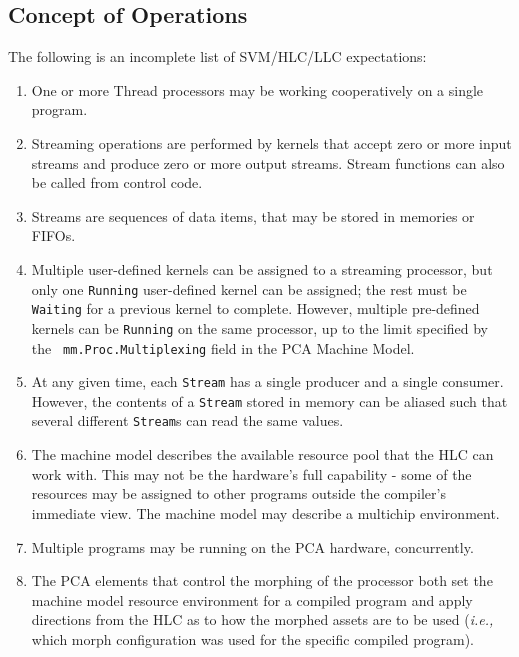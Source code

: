 \subsection{Concept of Operations}
\label{sec:conops}

The following is an incomplete list of SVM/HLC/LLC expectations:

\renewcommand{\labelenumi}{\theenumi.}

\begin{enumerate}

\item One or more Thread processors may be working cooperatively on a
single program.

\item Streaming operations are performed by kernels that accept zero
or more input streams and produce zero or more output streams.  Stream
functions can also be called from control code.

\item Streams are sequences of data items, that may be stored in
memories or FIFOs.

\item Multiple user-defined kernels can be assigned to a streaming
processor, but only one {\tt Running} user-defined kernel can be
assigned; the rest must be {\tt Waiting} for a previous kernel to
complete.  However, multiple pre-defined kernels can be {\tt Running}
on the same processor, up to the limit specified by the {\tt
mm.Proc.Multiplexing} field in the PCA Machine Model.

\item At any given time, each {\tt Stream} has a single producer and a
single consumer.  However, the contents of a {\tt Stream} stored in
memory can be aliased such that several different {\tt Stream}s can
read the same values.

\item The machine model describes the available resource pool that the
HLC can work with.  This may not be the hardware's full capability -
some of the resources may be assigned to other programs outside the
compiler's immediate view.  The machine model may describe a multichip
environment.

\item Multiple programs may be running on the PCA hardware,
concurrently.

\item The PCA elements that control the morphing of the processor both
set the machine model resource environment for a compiled program and
apply directions from the HLC as to how the morphed assets are to be
used ({\it i.e.,} which morph configuration was used for the specific
compiled program).


\end{enumerate}
